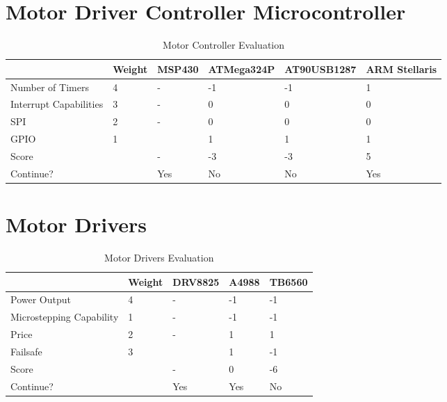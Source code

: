 \section{Motor Driver Controller Microcontroller}
\begin{table}[h]
\caption{Motor Controller Evaluation}
	\label{table:uCEval}
	\centering
\begin{tabular}{l|l|l|l|l|l|}
\cline{2-6}
                                              & Weight & MSP430 & ATMega324P & AT90USB1287 & ARM Stellaris \\ \hline
\multicolumn{1}{|l|}{Number of Timers}        & 4      & -      & -1         & -1          & 1             \\ \hline
\multicolumn{1}{|l|}{Interrupt Capabilities } & 3      & -      & 0          & 0           & 0             \\ \hline
\multicolumn{1}{|l|}{SPI}                     & 2      & -      & 0          & 0           & 0             \\ \hline
\multicolumn{1}{|l|}{GPIO}                    & 1      &        & 1          & 1           & 1             \\ \hline
\multicolumn{1}{|l|}{Score}                   &        & -      & -3         & -3          & 5             \\ \hline
\multicolumn{1}{|l|}{Continue?}               &        & Yes    & No         & No          & Yes           \\ \hline
\end{tabular}
\end{table}

\section{Motor Drivers}
\begin{table}[h]
\caption{Motor Drivers Evaluation}
	\label{table:MCEval}
	\centering
\begin{tabular}{|l|l|l|l|l|}
\hline
                         & Weight & DRV8825 & A4988 & TB6560 \\ \hline
Power Output             & 4      & -       & -1    & -1     \\ \hline
Microstepping Capability & 1      & -       & -1    & -1     \\ \hline
Price                    & 2      & -       & 1     & 1      \\ \hline
Failsafe                 & 3      &         & 1     & -1     \\ \hline
Score                    &        & -       & 0     & -6     \\ \hline
Continue?                &        & Yes     & Yes   & No     \\ \hline
\end{tabular}
\end{table}

